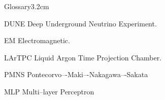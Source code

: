 \begin{mclistof}{Glossary}{3.2cm}

\item[DUNE] Deep Underground Neutrino Experiment.

\item[EM] Electromagnetic.

\item[LArTPC] Liquid Argon Time Projection Chamber.

\item[PMNS] Pontecorvo–-Maki–-Nakagawa–-Sakata

\item[MLP] Multi--layer Perceptron

\end{mclistof} 
